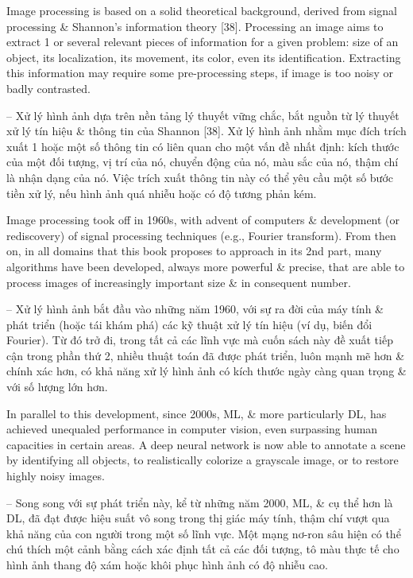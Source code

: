 \documentclass{article}
\begin{document}
\begin{itemize}
\begin{itemize}
        Image processing is based on a solid theoretical background, derived from signal processing \& Shannon's information theory [38]. Processing an image aims to extract 1 or several relevant pieces of information for a given problem: size of an object, its localization, its movement, its color, even its identification. Extracting this information may require some pre-processing steps, if image is too noisy or badly contrasted.
        
        -- Xử lý hình ảnh dựa trên nền tảng lý thuyết vững chắc, bắt nguồn từ lý thuyết xử lý tín hiệu \& thông tin của Shannon [38]. Xử lý hình ảnh nhằm mục đích trích xuất 1 hoặc một số thông tin có liên quan cho một vấn đề nhất định: kích thước của một đối tượng, vị trí của nó, chuyển động của nó, màu sắc của nó, thậm chí là nhận dạng của nó. Việc trích xuất thông tin này có thể yêu cầu một số bước tiền xử lý, nếu hình ảnh quá nhiễu hoặc có độ tương phản kém.
        
        Image processing took off in 1960s, with advent of computers \& development (or rediscovery) of signal processing techniques (e.g., Fourier transform). From then on, in all domains that this book proposes to approach in its 2nd part, many algorithms have been developed, always more powerful \& precise, that are able to process images of increasingly important size \& in consequent number.
        
        -- Xử lý hình ảnh bắt đầu vào những năm 1960, với sự ra đời của máy tính \& phát triển (hoặc tái khám phá) các kỹ thuật xử lý tín hiệu (ví dụ, biến đổi Fourier). Từ đó trở đi, trong tất cả các lĩnh vực mà cuốn sách này đề xuất tiếp cận trong phần thứ 2, nhiều thuật toán đã được phát triển, luôn mạnh mẽ hơn \& chính xác hơn, có khả năng xử lý hình ảnh có kích thước ngày càng quan trọng \& với số lượng lớn hơn.
        
        In parallel to this development, since 2000s, ML, \& more particularly DL, has achieved unequaled performance in computer vision, even surpassing human capacities in certain areas. A deep neural network is now able to annotate a scene by identifying all objects, to realistically colorize a grayscale image, or to restore highly noisy images.
        
        -- Song song với sự phát triển này, kể từ những năm 2000, ML, \& cụ thể hơn là DL, đã đạt được hiệu suất vô song trong thị giác máy tính, thậm chí vượt qua khả năng của con người trong một số lĩnh vực. Một mạng nơ-ron sâu hiện có thể chú thích một cảnh bằng cách xác định tất cả các đối tượng, tô màu thực tế cho hình ảnh thang độ xám hoặc khôi phục hình ảnh có độ nhiễu cao.
        

\end{itemize}
\end{itemize}
\end{document}
